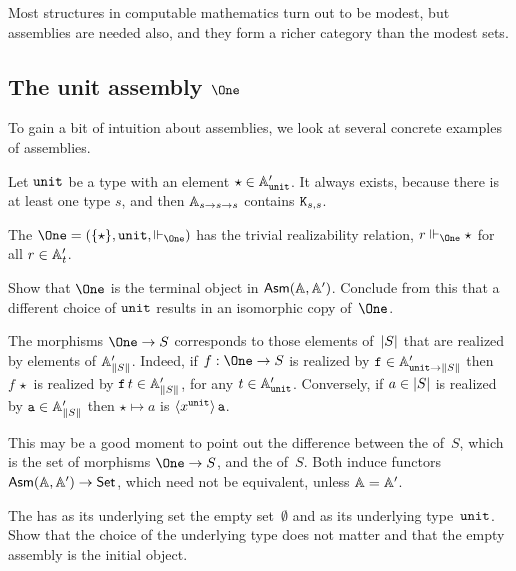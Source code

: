 Most structures in computable mathematics turn out to be modest, but assemblies are needed also, and they form a richer category than the modest sets.

\subsection{The unit assembly $\One$}
\label{sec:asm-unit}

To gain a bit of intuition about assemblies, we look at several concrete examples of assemblies.

Let $\unit$ be a type with an element $\ttunit \in \subAtyp{\unit}$.
It always exists, because there is at least one type $s$, and then
$\Atyp{s \to s \to s}$ contains $\combK_{s,s}$.

The  $\One = (\set{\star}, \unit, {\rz[\One]})$ has the trivial realizability relation, $r \rz[\One] \star$ for all $r \in \subAtyp{t}$.

\begin{exercise}
  Show that $\One$ is the terminal object
  in $\AsmA$. Conclude from this that a different choice of $\unit$ results in an isomorphic copy of~$\One$.
\end{exercise}

The morphisms $\One \to S$ corresponds to those elements of~$\S{S}$ that are realized by elements of $\subAtyp{\T{S}}$. Indeed, if $f : \One \to S$ is realized by $\R{f} \in \subAtyp{\unit \to \T{S}}$ then $f \, \star$ is realized by $\R{f} \, t \in \subAtyp{\T{S}}$, for any $t \in \subAtyp{\unit}$. Conversely, if $a \in \S{S}$ is realized by $\R{a} \in \subAtyp{\T{S}}$ then $\star \mapsto a$ is $\tpcalam{x}{\unit}{\R{a}}$.

This may be a good moment to point out the difference between the  of~$S$, which is the set of morphisms $\One \to S$, and the  of~$S$. Both induce functors $\AsmA \to \Set$, which need not be equivalent, unless $\AA = \subAA$.

\begin{exercise}
  The  has as its underlying set the empty set~$\emptyset$ and as its underlying type~$\unit$. Show that the choice of the underlying type does not matter and that the empty assembly is the initial object.
\end{exercise}


